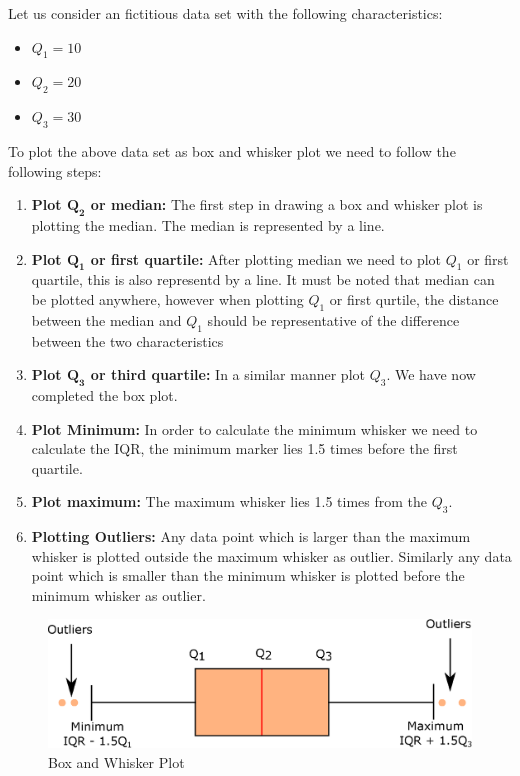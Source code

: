 \documentclass[twoside,12pt]{report}  %
\begin{document}
\begin{tcolorbox}[colback=blue!5!white, colframe=blue!75!black, title = \textbf{Box and Whisker Plot}]
	Let us consider an fictitious data set with the following characteristics:
	\begin{itemize}
		\item $Q_1 = 10$
		\item $Q_2 = 20$
		\item $Q_3 = 30$
	\end{itemize}
	
	To plot the above data set as box and whisker plot we need to follow the following steps:
	\begin{enumerate}
		\item \textbf{Plot $\boldsymbol{Q_2}$ or median:} The first step in drawing a box and whisker plot is plotting the median. The median is represented by a line.
		\item \textbf{Plot $\boldsymbol{Q_1}$ or first quartile:} After plotting median we need to plot $Q_1$ or first quartile, this is also representd by a line. It must be noted that median can be plotted anywhere, however when plotting $Q_1$ or first qurtile, the distance between the median and $Q_1$ should be representative of the difference between the two characteristics
		\item \textbf{Plot $\boldsymbol{Q_3}$ or third quartile:} In a similar manner plot $Q_3$. We have now completed the box plot.
		\item \textbf{Plot Minimum:} In order to calculate the minimum whisker we need to calculate the IQR, the minimum marker lies 1.5 times before the first quartile. 
		\item \textbf{Plot maximum:} The maximum whisker lies 1.5 times  from the $Q_3$.
		\item \textbf{Plotting Outliers:} Any data point which is larger than the maximum whisker is plotted outside the maximum whisker as outlier. Similarly any data point which is smaller than the minimum whisker is plotted before the minimum whisker as outlier.
		\end{enumerate}
	
	\begin{figure}[H]
		\centering
		\includegraphics[width=0.5\linewidth]{./images/box_whisker_plot.eps}
		\caption{Box and Whisker Plot}
		\label{box_whisker_plot_example}
	\end{figure}
\end{tcolorbox}
\end{document}

